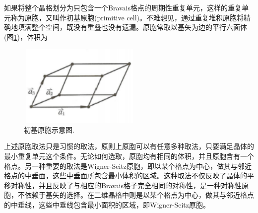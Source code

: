 如果将整个晶格划分为只包含一个Bravais格点的周期性重复单元，这样的重复单元称为原胞，又叫作初基原胞(primitive cell)。不难想见，通过重复堆积原胞将精确地填满整个空间，既没有重叠也没有遗漏。原胞常取以基矢为边的平行六面体(图\ref{Fig:Primitive_Cell})，体积为
\begin{figure}[h!]
\centering
\vspace*{-0.05in}
\includegraphics[height=1.55in,width=2.35in,viewport=0 0 38 25,clip]{Figures/Primitive_cell.png}
\caption{\small \textrm{初基原胞示意图.}}%
\label{Fig:Primitive_Cell}
\end{figure}
上述原胞取法只是习惯的取法，原则上原胞可以有任意多种取法，只要满足晶体的最小重复单元这个条件。无论如何选取，原胞均有相同的体积，并且原胞含有一个格点。另一种重要的取法是Wigner-Seitz原胞，即以某个格点为中心，做其与邻近格点的中垂面，这些中垂面所包含最小体积的区域。这种取法{不仅反映了晶体的平移对称性，并且反映了与相应的Bravais格子完全相同的对称性，是一种对称性原胞，不依赖于基矢的选择。}在二维晶格中则是以某个格点为中心，做其与邻近格点的中垂线，这些中垂线包含最小面积的区域，即Wigner-Seitz原胞。

